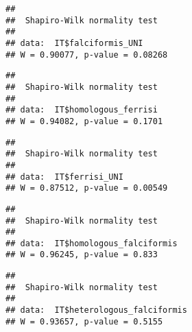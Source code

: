 \documentclass[
]{article}
\newenvironment{Shaded}{\begin{snugshade}}{\end{snugshade}}
\newcommand{\CommentTok}[1]{\textcolor[rgb]{0.56,0.35,0.01}{\textit{#1}}}
\newcommand{\FunctionTok}[1]{\textcolor[rgb]{0.00,0.00,0.00}{#1}}
\newcommand{\NormalTok}[1]{#1}
\newcommand{\SpecialCharTok}[1]{\textcolor[rgb]{0.00,0.00,0.00}{#1}}
\begin{document}
\begin{verbatim}
## 
##  Shapiro-Wilk normality test
## 
## data:  IT$falciformis_UNI
## W = 0.90077, p-value = 0.08268
\end{verbatim}

\begin{Shaded}
\end{Shaded}

\begin{verbatim}
## 
##  Shapiro-Wilk normality test
## 
## data:  IT$homologous_ferrisi
## W = 0.94082, p-value = 0.1701
\end{verbatim}

\begin{Shaded}
\end{Shaded}

\begin{verbatim}
## 
##  Shapiro-Wilk normality test
## 
## data:  IT$ferrisi_UNI
## W = 0.87512, p-value = 0.00549
\end{verbatim}

\begin{Shaded}
\end{Shaded}

\begin{verbatim}
## 
##  Shapiro-Wilk normality test
## 
## data:  IT$homologous_falciformis
## W = 0.96245, p-value = 0.833
\end{verbatim}

\begin{Shaded}
\end{Shaded}

\begin{verbatim}
## 
##  Shapiro-Wilk normality test
## 
## data:  IT$heterologous_falciformis
## W = 0.93657, p-value = 0.5155
\end{verbatim}
\end{document}
